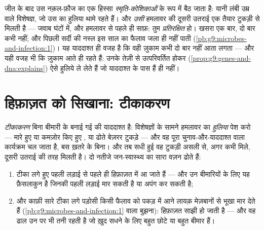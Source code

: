\begin{definition}[प्रतिरक्षा की याददाश्त]\label{def:g9:immune-defenses:memory}
जीत के बाद उस नक़ल-फ़ौज का एक हिस्सा \emph{स्मृति-कोशिकाओं}
के रूप में बैठ जाता है: यानी लंबी उम्र वाले विशेषज्ञ, जो उस
 का हुलिया थामे रहते हैं। और \emph{उसी} हमलावर की दूसरी उतराई एक
तैयार टुकड़ी से मिलती है --- जवाब घंटों में, और हमलावर  से पहले ही
साफ़: तुम \emph{प्रतिरक्षित} हो। खसरा एक बार, दो बार
कभी नहीं; और पिछली सर्दी की नस्ल इस साल का फैलाव जला ही नहीं पाती
(\cref{pb:g9:microbes-and-infection:1})। यह याददाश्त ही वजह है कि वही
ज़ुकाम कभी दो बार नहीं आता लगता --- और यही वजह भी कि ज़ुकाम आते ही रहते
हैं: उनके  तेज़ी से उत्परिवर्तित होकर
(\cref{prop:g9:genes-and-dna:explains}) ऐसे हुलिये ले लेते हैं जो
याददाश्त के पास हैं ही नहीं।
\end{definition}

\section{हिफ़ाज़त को सिखाना: टीकाकरण}

\begin{proposition}[टीकाकरण]\label{prop:g9:immune-defenses:vaccination}
\emph{टीकाकरण} बिना बीमारी के बनाई गई  की
याददाश्त है: विशेषज्ञों के सामने हमलावर का \emph{हुलिया} पेश करो ---
मारे हुए या कमज़ोर किए हुए , या  ढोते बेज़रर टुकड़े ---
और वह पूरा चुनाव-और-याददाश्त वाला कार्यक्रम चल जाता है, बस ख़तरे के बिना।
और तब सधी हुई वह टुकड़ी असली  से, अगर कभी मिले, दूसरी उतराई की तरह
मिलती है। दो नतीजे जन-स्वास्थ्य का सारा वज़न ढोते हैं:
\begin{enumerate}
  \item टीका लगे हुए पहली लड़ाई से पहले ही हिफ़ाज़त में आ जाते हैं ---
        और उन बीमारियों के लिए यह फ़ैसलाकुन है जिनकी पहली लड़ाई मार
        सकती है या अपंग कर सकती है;
  \item और काफ़ी सारे टीका लगे पड़ोसी किसी फैलाव को पकड़ में आने लायक़
        मेज़बानों से भूखा मार देते हैं
        (\cref{pb:g9:microbes-and-infection:1} वाला बुझना): हिफ़ाज़त
        साझी हो जाती है --- और वह ढाल उन पर भी तनी रहती है जो ख़ुद सधने
        के लिए बहुत छोटे या बहुत बीमार हैं।
\end{enumerate}
\end{proposition}
\admitted

